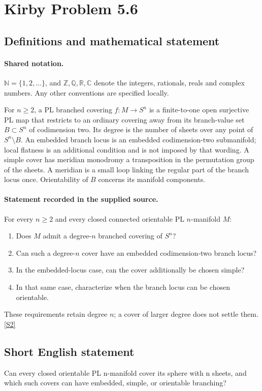 \documentclass[11pt]{article}
\newcommand{\sref}[2]{\hyperlink{source:#1:#2}{[S#2]}}
\begin{document}
\section{Kirby Problem 5.6}\label{statement}

\subsection{Definitions and mathematical statement}

\paragraph{Shared notation.}$\mathbb N=\{1,2,\ldots\}$, and $\mathbb Z,\mathbb Q,\mathbb R,\mathbb C$ denote the integers, rationals, reals and complex numbers. Any other conventions are specified locally.


For $n\geq2$, a PL branched covering $f:M\to S^n$ is a finite-to-one open surjective PL map that restricts to an ordinary covering away from its branch-value set $B\subset S^n$ of codimension two. Its degree is the number of sheets over any point of $S^n\setminus B$. An embedded branch locus is an embedded codimension-two submanifold; local flatness is an additional condition and is not imposed by that wording. A simple cover has meridian monodromy a transposition in the permutation group of the sheets. A meridian is a small loop linking the regular part of the branch locus once. Orientability of $B$ concerns its manifold components.
\paragraph{Statement recorded in the supplied source.}
For every $n\geq2$ and every closed connected orientable PL $n$-manifold $M$:
\begin{enumerate}
\item[(a)] Does $M$ admit a degree-$n$ branched covering of $S^n$?
\item[(b)] Can such a degree-$n$ cover have an embedded codimension-two branch locus?
\item[(c)] In the embedded-locus case, can the cover additionally be chosen simple?
\item[(d)] In that same case, characterize when the branch locus can be chosen orientable.
\end{enumerate}
These requirements retain degree $n$; a cover of larger degree does not settle them. \sref{statement}{2}
\subsection{Short English statement}
Can every closed orientable PL n-manifold cover its sphere with n sheets, and which such covers can have embedded, simple, or orientable branching?
\end{document}

